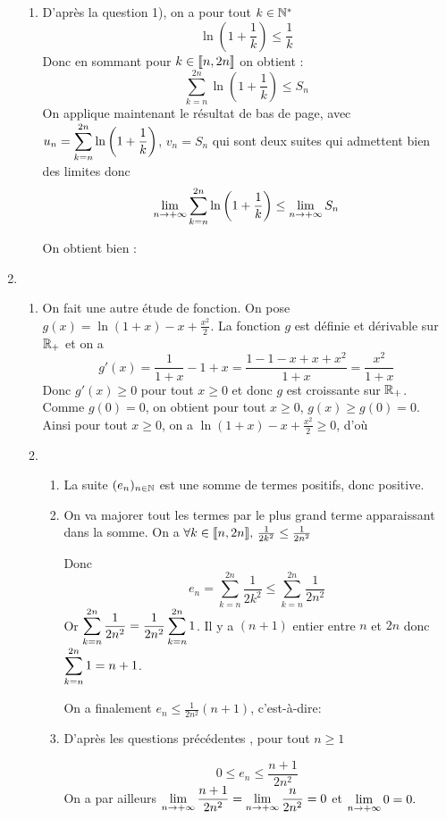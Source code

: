 \documentclass[a4paper, 11pt]{article}
\begin{document}
\begin{correction}
\begin{enumerate}
\begin{enumerate}
\item D'après la question 1), on a pour tout $k\in \mathbb{N}^*$ 
$$\ln\left( 1 +\frac{1}{k}\right) \leq \frac{1}{k}$$
Donc en sommant pour $k\in \llbracket n,2n\rrbracket$ on obtient : 
$$\sum_{k=n}^{2n} \ln\left( 1 +\frac{1}{k}\right)\leq S_n$$
On applique maintenant le résultat de bas de page, avec $u_n =\displaystyle  \sum_{k=n}^{2n} \ln\left( 1 +\frac{1}{k}\right)$, $v_n =S_n$ qui sont deux suites qui admettent bien des limites donc 
$$\lim_{n\rightarrow +\infty}  \sum_{k=n}^{2n} \ln\left( 1 +\frac{1}{k}\right) \leq \lim_{n\rightarrow +\infty} S_n$$

On obtient bien : 




 
\end{enumerate}
\item \begin{enumerate}
\item On fait une autre étude de fonction. On pose 
$g(x) =\ln(1+x) -x+\frac{x^2}{2}$. La fonction $g$ est définie et dérivable sur $\mathbb{R}_+$ et on a 
$$g'(x) = \frac{1}{1+x}-1 +x = \frac{1-1-x+x+x^2}{1+x}= \frac{x^2}{1+x}$$
Donc $g'(x)\geq 0 $ pour tout $x\geq 0$ et donc 
$g$ est croissante sur $\mathbb{R}_+$. Comme $g(0) = 0$, on obtient pour tout $x\geq 0$, $g(x)\geq g(0) =0 $.
Ainsi   pour tout $x\geq 0$, on a $\ln(1+x) -x+\frac{x^2}{2} \geq 0$, d'où

\item 
\begin{enumerate}
\item La suite $(e_n)_{n\in \mathbb{N}}$ est une somme de termes positifs, donc positive.
\item On va majorer tout les termes par le plus grand terme apparaissant dans la somme. On a 
$\forall k\in \llbracket n,2n\rrbracket , \, \frac{1}{2k^2} \leq \frac{1}{2n^2}$

Donc $$e_n =\sum_{k=n}^{2n} \frac{1}{2k^2}\leq \sum_{k=n}^{2n}  \frac{1}{2n^2}$$
Or $\displaystyle \sum_{k=n}^{2n}  \frac{1}{2n^2} = \frac{1}{2n^2} \sum_{k=n}^{2n} 1$. 
Il y a $(n+1)$ entier entre $n $ et $2n$ donc 
$\displaystyle \sum_{k=n}^{2n} 1 =n+1$.

On a finalement 
$e_n \leq \frac{1}{2n^2} (n+1)$, c'est-à-dire:

\item D'après les questions précédentes , pour tout $n\geq 1$ 

$$0\leq e_n \leq  \frac{n+1}{2n^2}$$
On a par ailleurs $\displaystyle  \lim_{n\rightarrow +\infty } \frac{n+1}{2n^2} =\lim_{n\rightarrow +\infty} \frac{n}{2n^2} = 0$ et $\displaystyle \lim_{n\rightarrow +\infty} 0=0.$


\end{enumerate}
\end{enumerate}
\end{enumerate}
\end{correction}
\end{document}
